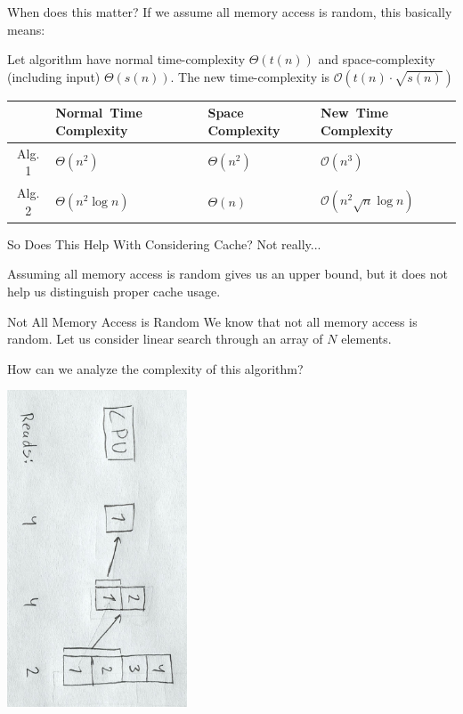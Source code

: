 \documentclass{beamer}
\begin{document}
\begin{frame}{When does this matter?}
If we assume all memory access is random, this basically means:
\begin{block}{}
  Let algorithm have normal time-complexity $\Theta(t(n))$ and space-complexity (including input) $\Theta(s(n))$. The new time-complexity is $\mathcal{O}(t(n)\cdot \sqrt{s(n)})$
\end{block}
\pause

\vfill
\begin{tabular}{|c|>{\raggedright}p{2.5cm}|>{\raggedright}p{2.5cm}|>{\raggedright}p{2.5cm}|} \hline & \textbf{Normal~Time \mbox{Complexity}} & \textbf{Space \mbox{Complexity}} & \textbf{New~Time \mbox{Complexity}} \tabularnewline
    \hline
    Alg. 1 & $\Theta(n^2)$ & $\Theta(n^2)$ & $\mathcal{O}(n^3)$ \tabularnewline
    \hline
    Alg. 2 & $\Theta(n^2 \log n)$ & $\Theta(n)$ & $\mathcal{O}(n^2 \sqrt{n} \log n)$ \tabularnewline
    \hline
\end{tabular}
\end{frame}

\begin{frame}{So Does This Help With Considering Cache?}
Not really...
\pause

Assuming all memory access is random gives us an upper bound, but it does not help us distinguish proper cache usage.
\end{frame}

\begin{frame}{Not All Memory Access is Random}
We know that not all memory access is random. Let us consider linear search through an array of $N$ elements.

How can we analyze the complexity of this algorithm?

\begin{center}
\includegraphics[width=0.4\textwidth,page=1,angle=90,origin=c]{resources/hand_drawings2.pdf}
\end{center}

\end{frame}
\end{document}

